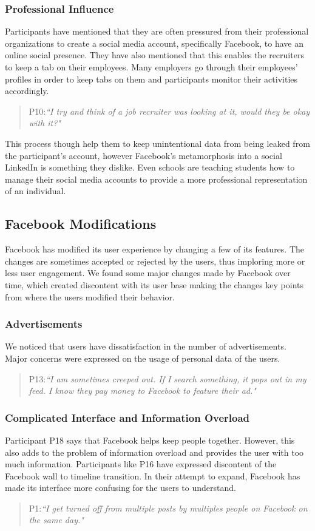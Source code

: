 \subsubsection{Professional Influence}
Participants have mentioned that they are often pressured from their professional organizations to create a social media account, specifically Facebook, to have an online social presence. They have also mentioned that this enables the recruiters to keep a tab on their employees. Many employers go through their employees' profiles in order to keep tabs on them and participants monitor their activities accordingly.
\begin{quote}
P10:\textit{``I try and think of a job recruiter was looking at it, would they be okay with it?"}
\end{quote}
This process though help them to keep unintentional data from being leaked from the participant's account, however Facebook's metamorphosis into a social LinkedIn is something they dislike. Even schools are teaching students how to manage their social media accounts to provide a more professional representation of an individual.

\subsection{Facebook Modifications}
Facebook has modified its user experience by changing a few of its features. The changes are sometimes accepted or rejected by the users, thus imploring more or less user engagement. We found some major changes made by Facebook over time, which created discontent with its user base making the changes key points from where the users modified their behavior.

\subsubsection{Advertisements}
We noticed that users have dissatisfaction in the number of advertisements. Major concerns were expressed on the usage of personal data of the users. 
\begin{quote}
P13:\textit{``I am sometimes creeped out. If I search something, it pops out in my feed. I know they pay money to Facebook to feature their ad."}
\end{quote}

\subsubsection{Complicated Interface and Information Overload}
Participant P18 says that Facebook helps keep people together. However, this also adds to the problem of information overload and provides the user with too much information. Participants like P16 have expressed discontent of the Facebook wall to timeline transition. In their attempt to expand, Facebook has made its interface more confusing for the users to understand. 
\begin{quote}
P1:\textit{``I get turned off from multiple posts by multiples people on Facebook on the same day."}
\end{quote}

